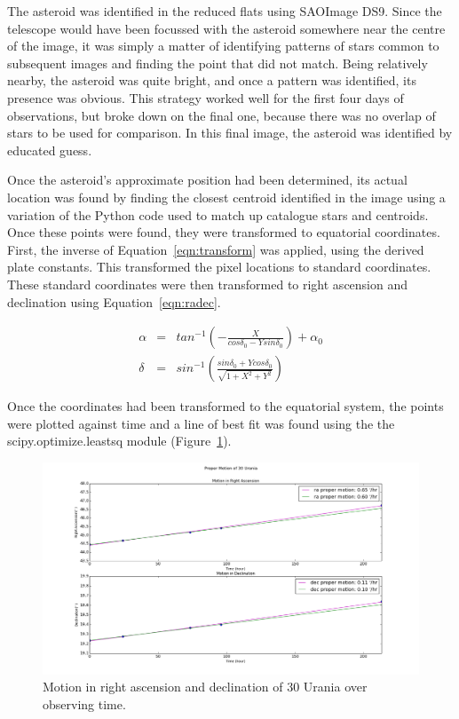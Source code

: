 \documentclass[a4paper,12pt]{article}
\begin{document}
The asteroid was identified in the reduced flats using SAOImage DS9. Since the telescope would have been focussed with the asteroid somewhere near the centre of the image, it was simply a matter of identifying patterns of stars common to subsequent images and finding the point that did not match. Being relatively nearby, the asteroid was quite bright, and once a pattern was identified, its presence was obvious. This strategy worked well for the first four days of observations, but broke down on the final one, because there was no overlap of stars to be used for comparison. In this final image, the asteroid was identified by educated guess.

Once the asteroid's approximate position had been determined, its actual location was found by finding the closest centroid identified in the image using a variation of the Python code used to match up catalogue stars and centroids. Once these points were found, they were transformed to equatorial coordinates. First, the inverse of Equation~\ref{eqn:transform} was applied, using the derived plate constants. This transformed the pixel locations to standard coordinates. These standard coordinates were then transformed to right ascension and declination using Equation~\ref{eqn:radec}.

\begin{equation}
\begin{array}{ccl}
\alpha &=& tan^{-1}\left(-\frac{X}{cos\delta_{0}-Ysin\delta_{0}}\right) + \alpha_{0}\\
\delta &=& sin^{-1}\left(\frac{sin\delta_{0} + Ycos\delta_{0}}{\sqrt{1+X^{2}+Y^{2}}}\right)
\end{array}
\label{eqn:radec}
\end{equation}

Once the coordinates had been transformed to the equatorial system, the points were plotted against time and a line of best fit was found using the the scipy.optimize.leastsq module (Figure~\ref{fig:pm}).

\begin{figure}[!htbp]
\centering
\includegraphics[scale = 0.35]{proper_motion.png}
\caption{Motion in right ascension and declination of 30 Urania over observing time.}
\label{fig:pm}
\end{figure}
\end{document}
